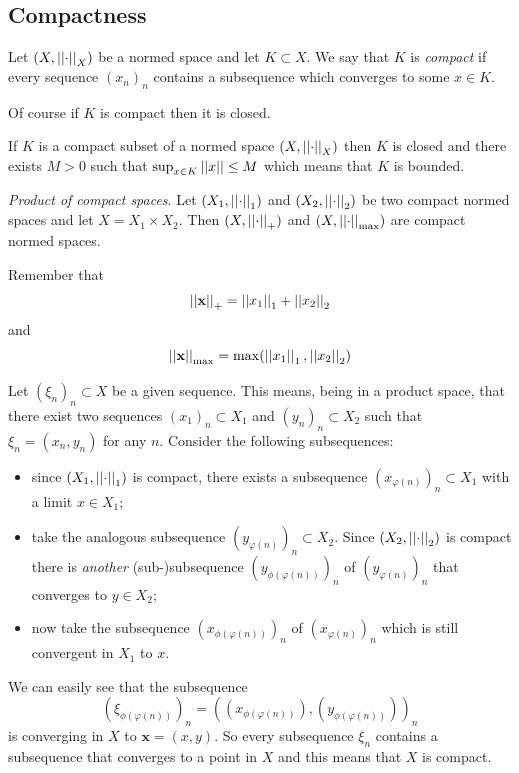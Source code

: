 \documentclass{article}
\begin{document}
\subsection{Compactness}
\begin{definition}
	Let $(X,\left|\left|\cdot\right|\right|_X)$ be a normed space and let $K\subset X$. We say that $K$ is \emph{compact} if every sequence ${(x_n)}_n$ contains a subsequence which converges to some $x\in K$.
\end{definition}Of course if $K$ is compact then it is closed.\begin{lemma}
If $K$ is a compact subset of a normed space $(X,\left|\left|\cdot\right|\right|_X)$ then $K$ is closed and there exists $M>0$ such that $\sup_{x\in K}\left|\left|x\right|\right|\leq M$ which means that $K$ is bounded.
\end{lemma}\begin{proposition}
\emph{Product of compact spaces}. Let $(X_1,\left|\left|\cdot\right|\right|_1)$ and $(X_2,\left|\left|\cdot\right|\right|_2)$ be two compact normed spaces and let $X=X_1\times X_2$. Then $(X,\left|\left|\cdot\right|\right|_+)$ and $(X,\left|\left|\cdot\right|\right|_{\max })$ are compact normed spaces.
\end{proposition}
Remember that 
\begin{equation*}
	\left|\left|\mathbf{x}\right|\right|_+=\left|\left|x_1\right|\right|_1+\left|\left|x_2\right|\right|_2
\end{equation*}
and
\begin{equation*}
	\left|\left|\mathbf{x}\right|\right|_{\max}=\max(\left|\left|x_1\right|\right|_1,\left|\left|x_2\right|\right|_2)
\end{equation*}
\begin{fancyproof}
	Let ${(\xi_{n})}_{n}\subset X$ be a given sequence. This means, being in a product space, that there exist two sequences ${(x_{1})}_{n}\subset X_{1}$ and ${(y_{n})}_{n}\subset X_{2}$ such that $\xi_{n}=(x_{n},y_{n})$ for any $n$. Consider the following subsequences:
	\begin{itemize}
		\item since $(X_1,\left|\left|\cdot\right|\right|_1)$ is compact, there exists a subsequence ${(x_{\varphi(n)})}_{n}\subset X_1$ with a limit $x\in X_{1}$;
		\item take the analogous subsequence ${(y_{\varphi(n)})}_{n}\subset X_2$. Since $(X_2,\left|\left|\cdot\right|\right|_2)$ is compact there is \textit{another} (sub-)subsequence ${(y_{\phi(\varphi(n))})}_{n}$ of ${(y_{\varphi(n)})}_{n}$ that converges to $y\in X_{2}$;
		\item now take the subsequence  ${(x_{\phi(\varphi(n))})}_{n}$ of ${(x_{\varphi(n)})}_{n}$ which is still convergent in $X_{1}$ to $x$.
	\end{itemize}
	We can easily see that the subsequence
	\begin{equation*}
		{(\xi_{\phi(\varphi(n))})}_{n}={\left((x_{\phi(\varphi(n))}),(y_{\phi(\varphi(n))})\right)}_{n}
	\end{equation*}
	is converging in $X$ to $\mathbf{x}=(x,y)$. So every subsequence $\xi_{n}$ contains a subsequence that converges to a point in $X$ and this means that $X$ is compact.
\end{fancyproof}
\end{document}
